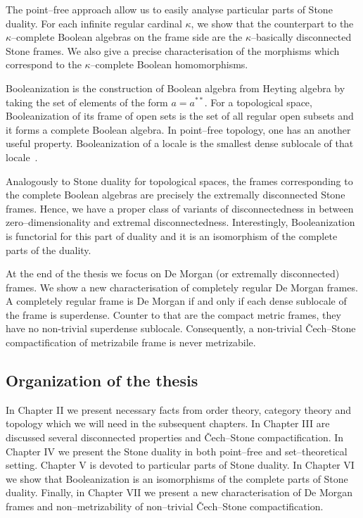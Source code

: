 The point--free approach allow us to easily analyse particular parts of Stone duality.
For each infinite regular cardinal $\kappa$, we show that the counterpart to the $\kappa$--complete Boolean algebras on the frame side are the $\kappa$--basically disconnected Stone frames.
We also give a precise characterisation of the morphisms which correspond to the $\kappa$--complete Boolean homomorphisms.

Booleanization is the construction of Boolean algebra from Heyting algebra by taking the set of elements of the form $a = a^{**}$.
For a topological space, Booleanization of its frame of open sets is the set of all regular open subsets and it forms a complete Boolean algebra.
In point--free topology, one has an another useful property.
Booleanization of a locale is the smallest dense sublocale of that locale~\cite{banaschewski1996booleanization}.

Analogously to Stone duality for topological spaces, the frames corresponding to the complete Boolean algebras are precisely the extremally disconnected Stone frames.
Hence, we have a proper class of variants of disconnectedness in between zero--dimensionality and extremal disconnectedness. %
Interestingly, Booleanization is functorial for this part of duality and it is an isomorphism of the complete parts of the duality.

At the end of the thesis we focus on De Morgan (or extremally disconnected) frames.
We show a new characterisation of completely regular De Morgan frames.
A completely regular frame is De Morgan if and only if each dense sublocale of the frame is superdense.
Counter to that are the compact metric frames, they have no non-trivial superdense sublocale.
Consequently, a non-trivial \v{C}ech--Stone compactification of metrizabile frame is never metrizabile.


\subsection*{Organization of the thesis}

In Chapter II we present necessary facts from order theory, category theory and topology which we will need in the subsequent chapters.
In Chapter III are discussed several disconnected properties and \v{C}ech--Stone compactification. %
In Chapter IV we present the Stone duality in both point--free and set--theoretical setting.
Chapter V is devoted to particular parts of Stone duality.
In Chapter VI we show that Booleanization is an isomorphisms of the complete parts of Stone duality.
Finally, in Chapter VII we present a new characterisation of De Morgan frames and non--metrizability of non--trivial \v{C}ech--Stone compactification.

